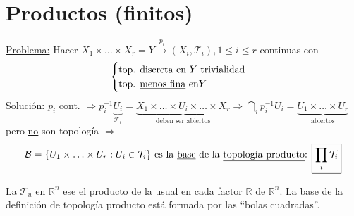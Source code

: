\section{Productos (finitos)}%
\label{sec:productos_finitos_}
\underline{Problema:} Hacer $X_1 \times \ldots \times X_r = Y \xrightarrow{p_i} \left( X_i, \mathcal{T}_i \right), 1 \le i \le r$ continuas con 
\[
\begin{cases}
    \text{top. discreta en } Y \text{ trivialidad}\\
    \text{top. \underline{menos fina} en} Y
\end{cases} 
\]
\underline{Solución:} $p_i$ cont. $\Rightarrow p_i^{-1} \underbrace{U_i}_{\mathcal{T}_i} = \underbrace{X_1 \times \ldots \times U_i \times \ldots \times X_r}_{\text{deben ser abiertos}}  \Rightarrow \bigcap_{i} p_i^{-1}U_i = \underbrace{U_1 \times \ldots \times U_r}_{\text{abiertos}}$ pero \underline{no} son topología $\Rightarrow$
\[
\mathcal{B} = \{U_1 \times \ldots \times U_r: U_i \in \mathcal{T}_i \} \text{ es la \underline{base} de la \underline{topología producto}: } \boxed{\prod_{i} \mathcal{T}_i} 
\]
\begin{ej}
La $\mathcal{T}_u$ en $\mathbb{R}^n$ ese el producto de la usual en cada factor $\mathbb{R}$ de $\mathbb{R}^n$. La base de la definición de topología producto está formada por las ``bolas cuadradas''.
\end{ej}


